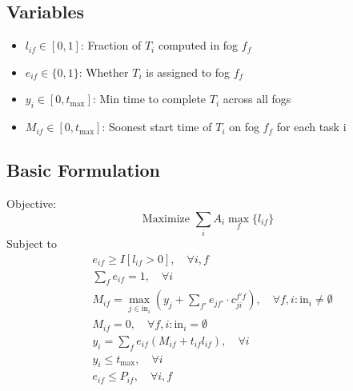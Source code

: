 \subsection{Variables}
\begin{itemize}[leftmargin=*]
    \item $l_{if} \in [0,1]$: Fraction of $T_{i}$ computed in fog $f_f$
    \item $e_{if} \in \{0,1\}$: Whether $T_{i}$ is assigned to fog $f_f$
    \item $y_{i} \in [0,t_{\max}]$: Min time to complete $T_i$ across all fogs
    \item $M_{if} \in [0,t_{\max}]$: Soonest start time of $T_i$ on fog $f_f$ for each task i 
\end{itemize}

\subsection{Basic Formulation}
\label{sec:basic}

Objective:
\begin{equation}
\label{eq:objective}
    \text{Maximize } \sum_i A_i \max_f \{ l_{if} \}
\end{equation}
Subject to
\begin{align}
    &e_{if} \geq I[l_{if}>0], \quad \forall i, f \label{eq:lvse} \\ 
    &\sum_f e_{if} = 1, \quad \forall i \label{eq:onefog} \\
    &M_{if} = \max_{j \in \text{in}_i} \left( y_j + \sum_{f'} e_{jf'}  \cdot c_{ji}^{f'f} \right), \quad \forall f, i: \text{in}_i \neq \emptyset
    \label{eq:resMif-noempty}\\
    &M_{if} = 0, \quad \forall f, i: \text{in}_i = \emptyset
    \label{eq:resMif} \\
    &y_i = \sum_f e_{if} \left( M_{if} + t_{if} l_{if} \right) , \quad \forall i  \label{eq-36}\\
    &y_i \leq t_{\max}, \quad \forall i \label{eq:yitmax} \\
    &e_{if} \leq P_{if}, \quad \forall i,f \label{eq:permitted}
\end{align}

